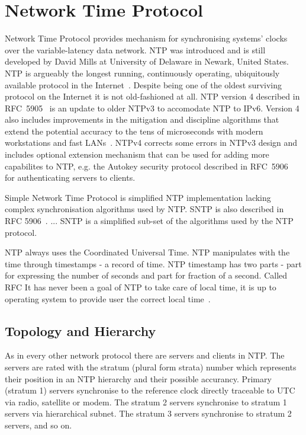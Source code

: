 
\chapter{Network Time Protocol}
Network Time Protocol provides mechanism for synchronising systems' clocks over the variable-latency data network.
NTP was introduced and is still developed by David Mills at University of Delaware in Newark, United States.
NTP is argueably the longest running, continuously operating,
ubiquitously available protocol in the Internet~\cite{ntp-overview}.
Despite being one of the oldest surviving protocol on the Internet it is not old-fashioned at all.
NTP version 4 described in RFC~5905~\cite{rfc5905} is an update to older NTPv3 to accomodate NTP to IPv6.
Version 4 also includes improvements in
the mitigation and discipline algorithms that extend
the potential accuracy to the tens of microseconds with modern
workstations and fast LANs~\cite{rfc5905}.
NTPv4 corrects some
errors in NTPv3 design and includes optional extension mechanism
that can be used for adding more capabilites to NTP, e.g. the
Autokey security protocol described in RFC~5906~\cite{rfc5906}
for authenticating servers to clients.

Simple Network Time Protocol is simplified NTP implementation lacking complex
synchronisation algorithms used by NTP.
SNTP is also described in RFC 5906~\cite{rfc5906}.
\!...
SNTP is a simplified sub-set of the algorithms used by the NTP protocol.

NTP always uses the Coordinated Universal Time.
NTP manipulates with the time through timestamps - a record of time.
NTP timestamp has two parts - part for expressing the number of seconds
and part for fraction of a second. \!Called RFC
It has never been a goal of NTP to take care of local time,
it is up to operating system to provide user the correct local time~\cite{ntp-overview}.

\section{Topology and Hierarchy}
As in every other network protocol there are servers and clients in NTP.
The servers are rated with the stratum (plural form strata) number which represents their position
in an NTP hierarchy and their possible accurancy.
Primary (stratum 1) servers synchronise to the reference clock directly traceable to UTC via
radio, satellite or modem.
The stratum 2 servers synchronise to stratum 1
servers via hierarchical subnet.
The stratum 3 servers synchronise to stratum 2 servers, and so on.

